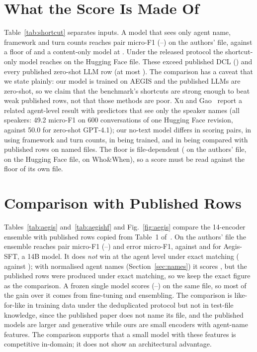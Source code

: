 \documentclass[conference]{IEEEtran}
\begin{document}
\section{What the Score Is Made Of}\label{sec:shortcut}
Table~\ref{tab:shortcut} separates inputs. A model that sees only agent name, framework and turn counts reaches \shortAEpair{} pair micro-F1 (\shortAEpairLo--\shortAEpairHi) on the authors' file, against a floor of \floorAE{} and a content-only model at \contentAEpair. Under the released protocol the shortcut-only model reaches \shortHFrel{} on the Hugging Face file. These exceed published DCL (\pubDCL) and every published zero-shot LLM row (at most \pubOthree). The comparison has a caveat that we state plainly: our model is trained on AEGIS and the published LLMs are zero-shot, so we claim that the benchmark's shortcuts are strong enough to beat weak published rows, not that those methods are poor. Xu and Gao~\cite{audit2} report a related agent-level result with predictors that see only the speaker names (all speakers: 49.2 micro-F1 on 600 conversations of one Hugging Face revision, against 50.0 for zero-shot GPT-4.1); our no-text model differs in scoring pairs, in using framework and turn counts, in being trained, and in being compared with published rows on named files. The floor is file-dependent (\floorAE{} on the authors' file, \floorHF{} on the Hugging Face file, \floorWW{} on Who\&When), so a score must be read against the floor of its own file.

\section{Comparison with Published Rows}\label{sec:main}
Tables~\ref{tab:aegis} and~\ref{tab:aegishf} and Fig.~\ref{fig:aegis} compare the 14-encoder ensemble with published rows copied from Table~1 of~\cite{aegis}. On the authors' file the ensemble reaches \ensAEpair{} pair micro-F1 (\ensAEpairLo--\ensAEpairHi) and \ensAEerror{} error micro-F1, against \pubSFT{} and \pubSFTerror{} for Aegis-SFT, a 14B model. It does \emph{not} win at the agent level under exact matching (\ensAEagent{} against \pubSFTagent); with normalised agent names (Section~\ref{sec:names}) it scores \nmAgentNorm{}, but the published rows were produced under exact matching, so we keep the exact figure as the comparison. A frozen single model scores \fullAEdedup{} (\fullAEdedupLo--\fullAEdedupHi) on the same file, so most of the gain over it comes from fine-tuning and ensembling. The comparison is like-for-like in training data under the deduplicated protocol but not in test-file knowledge, since the published paper does not name its file, and the published models are larger and generative while ours are small encoders with agent-name features. The comparison supports that a small model with these features is competitive in-domain; it does not show an architectural advantage.
\end{document}
